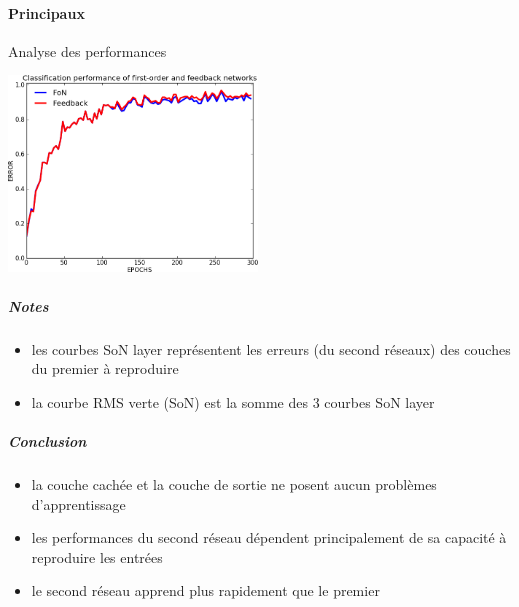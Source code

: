     \paragraph{Principaux}
      Analyse des performances
      \begin{center}
	\includegraphics[width=250px]{data/expD2/perff.png}
      \end{center}
      \subparagraph{Notes}
	\begin{itemize}
	  \item les courbes SoN layer représentent les erreurs (du second réseaux) des couches du premier à reproduire 
	  \item la courbe RMS verte (SoN) est la somme des 3 courbes SoN layer
	\end{itemize}
      \subparagraph{Conclusion}
	\begin{itemize}
	  \item la couche cachée et la couche de sortie ne posent aucun problèmes d'apprentissage
	  \item les performances du second réseau dépendent principalement de sa capacité à reproduire les entrées
	  \item le second réseau apprend plus rapidement que le premier
	\end{itemize}
